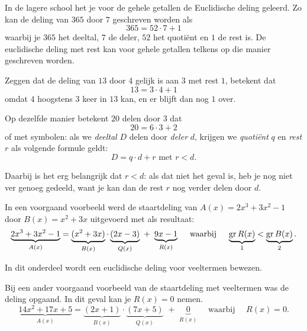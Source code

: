 \documentclass{ximera}
\begin{document}
	\author{Koen de Naeghel - Wiskunde Op Maat}
    \xmsource



In de lagere school het je voor de gehele getallen de Euclidische deling geleerd. Zo kan de deling van $365$ door $7$ geschreven worden als
\[
365 = 52 \cdot 7 + 1
\]
waarbij je $365$ het deeltal, $7$ de deler, $52$ het quotiënt en $1$ de rest is. De euclidische deling met rest kan voor gehele getallen telkens op die manier geschreven worden. 


\begin{example}\nl
         
	Zeggen dat de deling van $13$ door $4$ gelijk is aan $3$ met rest $1$, betekent dat
	\[
	13 = 3 \cdot 4  + 1
	\]
	omdat $4$ hoogstens $3$ keer in $13$ kan, en er blijft dan nog $1$ over.
	 
	Op dezelfde manier betekent $20$ delen door $3$ dat
	\[
	20 = 6\cdot 3 + 2
	\]
	of met symbolen: als we \textit{deeltal} $D$ delen door \textit{deler} $d$, krijgen we \textit{quotiënt} $q$ en \textit{rest} $r$ als volgende formule geldt:
	\[
	D = q\cdot d + r   \text{ met $r<d$}.
	\]
	 
	 
	Daarbij is het erg belangrijk dat $r<d$: als dat niet het geval is, heb je nog niet ver genoeg gedeeld, want je kan dan de rest $r$ nog verder delen door $d$.
	 
\end{example}







In een voorgaand voorbeeld werd de staartdeling van $A(x) = 2x^3+3x^2-1$ door $B(x) = x^2+3x$ uitgevoerd met als resultaat: 
\[
\underbrace{2x^3+3x^2-1}_{A(x)} = \underbrace{(x^2+3x)}_{B(x)}\cdot\underbrace{(2x-3)}_{Q(x)} \,\, + \,\, \underbrace{9x-1}_{R(x)} \quad \text{ waarbij } \quad \underbrace{\operatorname{gr} R(x)}_{1} < \underbrace{\operatorname{gr} B(x)}_{2}.
\]

In dit onderdeel wordt een euclidische deling voor veeltermen bewezen.


Bij een ander voorgaand voorbeeld van de staartdeling met veeltermen was de deling opgaand. In dit geval kan je \( R(x) = 0\) nemen. 
\[
\underbrace{14x^2+17x+5}_{A(x)} = \underbrace{(2x+1)}_{B(x)}\cdot\underbrace{(7x+5)}_{Q(x)} \,\, + \,\, \underbrace{0}_{R(x)} \quad \text{ waarbij } \quad R(x) = 0.
\]
\end{document}

